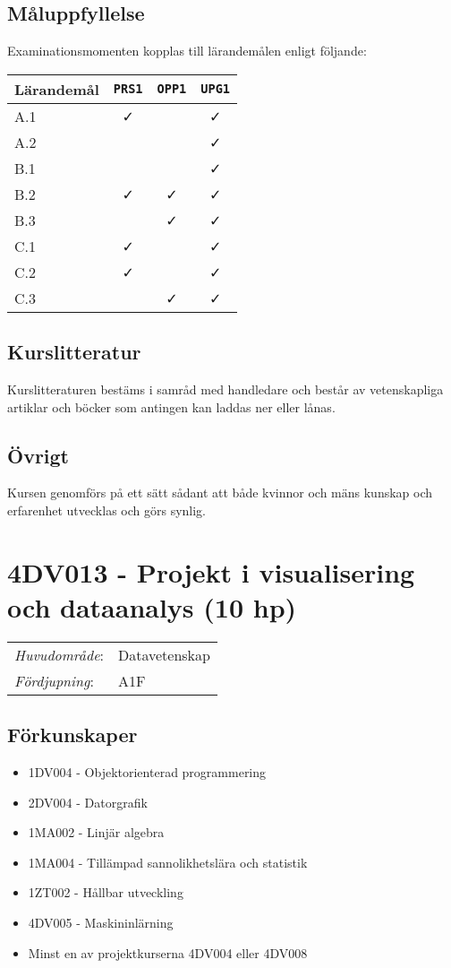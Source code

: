 \subsection*{Måluppfyllelse}

Examinationsmomenten kopplas till lärandemålen enligt följande:

\begin{longtable}[]{@{}lccc@{}}
\toprule
\textsf{Lärandemål} & \texttt{PRS1} & \texttt{OPP1} & \texttt{UPG1}\tabularnewline
\midrule
\endhead
A.1 & \faCheck & & \faCheck\tabularnewline
A.2 & & & \faCheck\tabularnewline
B.1 & & & \faCheck\tabularnewline
B.2 & \faCheck & \faCheck & \faCheck\tabularnewline
B.3 & & \faCheck & \faCheck\tabularnewline
C.1 & \faCheck & & \faCheck\tabularnewline
C.2 & \faCheck & & \faCheck\tabularnewline
C.3 & & \faCheck & \faCheck\tabularnewline
\bottomrule
\end{longtable}

\subsection*{Kurslitteratur}

Kurslitteraturen bestäms i samråd med handledare och består av
vetenskapliga artiklar och böcker som antingen kan laddas ner eller
lånas.

\subsection*{Övrigt}

Kursen genomförs på ett sätt sådant att både kvinnor och mäns kunskap och erfarenhet utvecklas och görs synlig.
\pagebreak
\section*{4DV013 - Projekt i visualisering och dataanalys (10 hp)}

\begin{tabular}{ll}\emph{Huvudområde}: & Datavetenskap\tabularnewline\emph{Fördjupning}: & A1F\tabularnewline\end{tabular}

\subsection*{Förkunskaper}

\begin{itemize}
\tightlist
\item
  1DV004 - Objektorienterad programmering
\item
  2DV004 - Datorgrafik
\item
  1MA002 - Linjär algebra
\item
  1MA004 - Tillämpad sannolikhetslära och statistik
\item
  1ZT002 - Hållbar utveckling
\item
  4DV005 - Maskininlärning
\item
  Minst en av projektkurserna 4DV004 eller 4DV008
\end{itemize}

